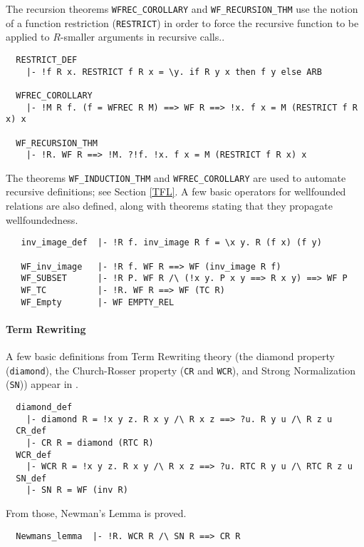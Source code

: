 The recursion theorems {\small\verb+WFREC_COROLLARY+} and
{\small\verb+WF_RECURSION_THM+} use the notion of a function
restriction ({\small\verb+RESTRICT+}) in order to force the recursive
function to be applied to $R$-smaller arguments in recursive calls..
%
\begin{hol}
{\small
\begin{verbatim}
  RESTRICT_DEF
    |- !f R x. RESTRICT f R x = \y. if R y x then f y else ARB

  WFREC_COROLLARY
    |- !M R f. (f = WFREC R M) ==> WF R ==> !x. f x = M (RESTRICT f R x) x

  WF_RECURSION_THM
    |- !R. WF R ==> !M. ?!f. !x. f x = M (RESTRICT f R x) x
\end{verbatim}
}
\end{hol}

\noindent The theorems {\small\verb+WF_INDUCTION_THM+} and
{\small\verb+WFREC_COROLLARY+} are used to automate recursive
definitions; see Section \ref{TFL}. A few basic operators for
wellfounded relations are also defined, along with theorems stating
that they propagate wellfoundedness.

\begin{hol}
\begin{verbatim}
   inv_image_def  |- !R f. inv_image R f = \x y. R (f x) (f y)

   WF_inv_image   |- !R f. WF R ==> WF (inv_image R f)
   WF_SUBSET      |- !R P. WF R /\ (!x y. P x y ==> R x y) ==> WF P
   WF_TC          |- !R. WF R ==> WF (TC R)
   WF_Empty       |- WF EMPTY_REL
\end{verbatim}
\end{hol}

\paragraph {Term Rewriting}

A few basic definitions from Term Rewriting theory
(the diamond property (\verb+diamond+), the Church-Rosser
property ({\small\verb+CR+} and {\small\verb+WCR+}), and Strong
Normalization ({\small\verb+SN+})) appear
in .
%
\begin{hol}
{\small
\begin{verbatim}
  diamond_def
    |- diamond R = !x y z. R x y /\ R x z ==> ?u. R y u /\ R z u
  CR_def
    |- CR R = diamond (RTC R)
  WCR_def
    |- WCR R = !x y z. R x y /\ R x z ==> ?u. RTC R y u /\ RTC R z u
  SN_def
    |- SN R = WF (inv R)
\end{verbatim}
}
\end{hol}
%
\noindent From those, Newman's Lemma is proved.
%
\begin{hol}
{\small
\begin{verbatim}
  Newmans_lemma  |- !R. WCR R /\ SN R ==> CR R
\end{verbatim}
}
\end{hol}

